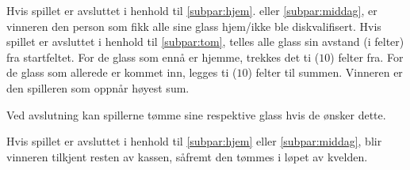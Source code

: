\begin{ludol}
\item Hvis spillet er avsluttet i henhold til \cref{subpar:hjem}. eller
  \cref{subpar:middag}, er vinneren den person som fikk alle sine glass
  hjem/ikke ble diskvalifisert. Hvis spillet er avsluttet i henhold til
  \cref{subpar:tom}, telles alle glass sin avstand (i felter) fra startfeltet.
  For de glass som ennå er hjemme, trekkes det ti ($10$) felter fra. For de
  glass som allerede er kommet inn, legges ti ($10$) felter til summen. Vinneren
  er den spilleren som oppnår høyest sum.

\item Ved avslutning kan spillerne tømme sine respektive glass hvis de ønsker
  dette.

\item Hvis spillet er avsluttet i henhold til \cref{subpar:hjem} eller
  \ref{subpar:middag}, blir vinneren tilkjent resten av kassen, såfremt den
  tømmes i løpet av kvelden.

\end{ludol}